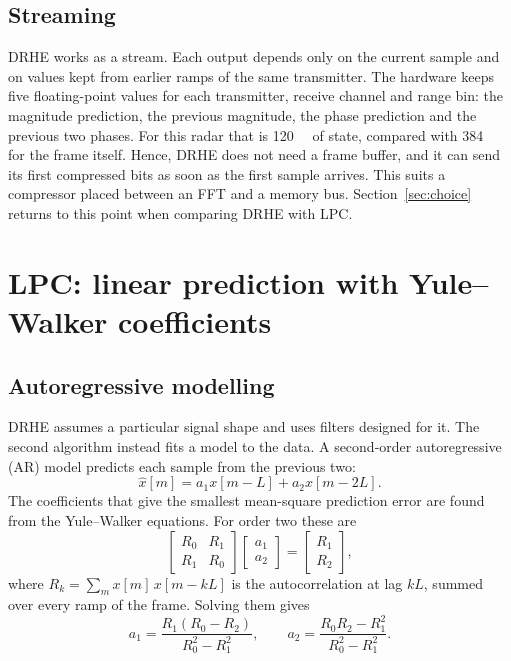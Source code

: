 \subsection{Streaming}

DRHE works as a stream. Each output depends only on the current sample and on
values kept from earlier ramps of the same transmitter. The hardware keeps five
floating-point values for each transmitter, receive channel and range bin: the
magnitude prediction, the previous magnitude, the phase prediction and the
previous two phases. For this radar that is \SI{120}{\kibi\byte} of state,
compared with \SI{384}{\kibi\byte} for the frame itself. Hence, DRHE does not
need a frame buffer, and it can send its first compressed bits as soon as the
first sample arrives. This suits a compressor placed between an FFT and a
memory bus. Section~\ref{sec:choice} returns to this point when comparing DRHE
with LPC.

\section{LPC: linear prediction with Yule--Walker coefficients}
\label{sec:lpc}

\subsection{Autoregressive modelling}

DRHE assumes a particular signal shape and uses filters designed for it. The
second algorithm instead fits a model to the data. A second-order
autoregressive (AR) model predicts each sample from the previous two:
\begin{equation}
\label{eq:ar2}
\hat{x}[m] = a_1 x[m-L] + a_2 x[m-2L].
\end{equation}
The coefficients that give the smallest mean-square prediction error are found
from the Yule--Walker equations. For order two these are
\begin{equation}
\begin{bmatrix} R_0 & R_1 \\ R_1 & R_0 \end{bmatrix}
\begin{bmatrix} a_1 \\ a_2 \end{bmatrix}
=
\begin{bmatrix} R_1 \\ R_2 \end{bmatrix},
\end{equation}
where $R_k = \sum_m x[m]\,x[m-kL]$ is the autocorrelation at lag $kL$, summed
over every ramp of the frame. Solving them gives
\begin{equation}
\label{eq:yw}
a_1 = \frac{R_1(R_0 - R_2)}{R_0^2 - R_1^2},
\qquad
a_2 = \frac{R_0 R_2 - R_1^2}{R_0^2 - R_1^2}.
\end{equation}

